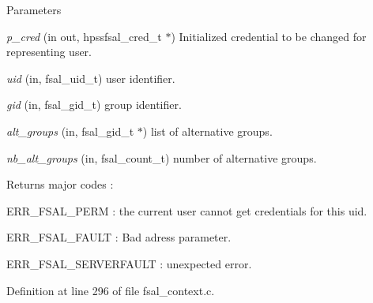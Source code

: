 \begin{DoxyParams}{Parameters}
\item[{\em p\_\-cred}](in out, hpssfsal\_\-cred\_\-t $\ast$) Initialized credential to be changed for representing user. \item[{\em uid}](in, fsal\_\-uid\_\-t) user identifier. \item[{\em gid}](in, fsal\_\-gid\_\-t) group identifier. \item[{\em alt\_\-groups}](in, fsal\_\-gid\_\-t $\ast$) list of alternative groups. \item[{\em nb\_\-alt\_\-groups}](in, fsal\_\-count\_\-t) number of alternative groups.\end{DoxyParams}
\begin{DoxyReturn}{Returns}
major codes :
\begin{DoxyItemize}
\item ERR\_\-FSAL\_\-PERM : the current user cannot get credentials for this uid.
\item ERR\_\-FSAL\_\-FAULT : Bad adress parameter.
\item ERR\_\-FSAL\_\-SERVERFAULT : unexpected error. 
\end{DoxyItemize}
\end{DoxyReturn}


Definition at line 296 of file fsal\_\-context.c.